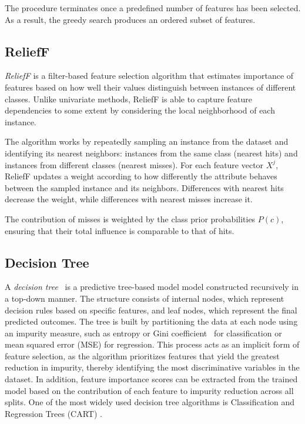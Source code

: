 The procedure terminates once a predefined number of features has been selected. As a result, the greedy search produces an ordered subset of features.

\subsection{ReliefF}
\emph{ReliefF} \cite{kononenko1994relieff} is a filter-based feature selection algorithm that estimates importance of features based on how well their values distinguish between instances of different classes. Unlike univariate methods, ReliefF is able to capture feature dependencies to some extent by considering the local neighborhood of each instance.

The algorithm works by repeatedly sampling an instance from the dataset and identifying its nearest neighbors: instances from the same class (nearest hits) and instances from different classes (nearest misses). For each feature vector $X^{j}$, ReliefF updates a weight according to how differently the attribute behaves between the sampled instance and its neighbors. Differences with nearest hits decrease the weight, while differences with nearest misses increase it. 

The contribution of misses is weighted by the class prior probabilities \(P(c)\), ensuring that their total influence is comparable to that of hits.

\subsection{Decision Tree}
A \emph{decision tree}~\cite{breiman1984} is a predictive tree-based model model constructed recursively in a top-down manner. The structure consists of internal nodes, which represent decision rules based on specific features, and leaf nodes, which represent the final predicted outcomes. The tree is built by partitioning the data at each node using an impurity measure, such as entropy or Gini coefficient~\cite{gini1912} for classification or mean squared error (MSE) for regression. This process acts as an implicit form of feature selection, as the algorithm prioritizes features that yield the greatest reduction in impurity, thereby identifying the most discriminative variables in the dataset. In addition, feature importance scores can be extracted from the trained model based on the contribution of each feature to impurity reduction across all splits. One of the most widely used decision tree algorithms is Classification and Regression Trees (CART) \cite{breiman1984}.

